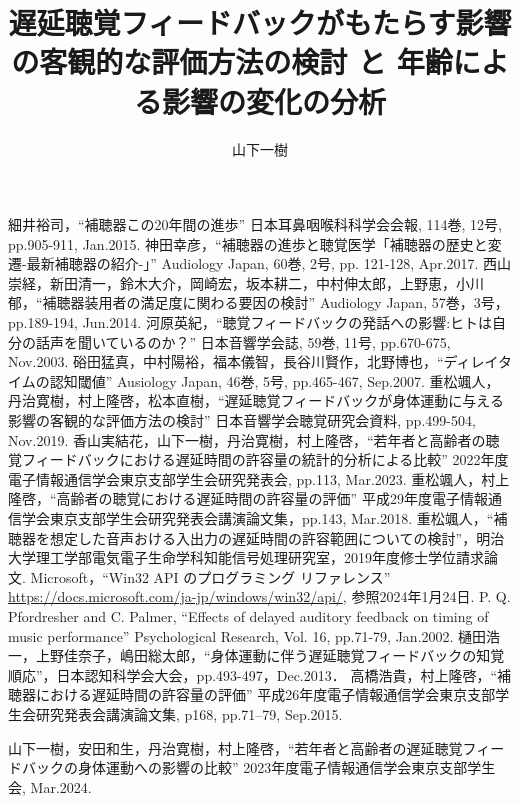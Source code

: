 \documentclass[a4paper,12pt]{jsreport}
\title{遅延聴覚フィードバックがもたらす影響の客観的な評価方法の検討
と
年齢による影響の変化の分析}
\author{山下\hspace{1zw}一樹}%
\begin{document}
\makecover%
\tableofcontents%










\begin{thebibliography}{99}
	細井裕司，``補聴器この20年間の進歩'' 日本耳鼻咽喉科科学会会報, 114巻, 12号, pp.905-911, Jan.2015.
  神田幸彦，``補聴器の進歩と聴覚医学「補聴器の歴史と変遷-最新補聴器の紹介-」'' Audiology Japan, 60巻, 2号, pp. 121-128, Apr.2017.
  西山崇経，新田清一，鈴木大介，岡崎宏，坂本耕二，中村伸太郎，上野恵，小川郁，``補聴器装用者の満足度に関わる要因の検討'' Audiology Japan, 57巻，3号，pp.189-194, Jun.2014.
  河原英紀，``聴覚フィードバックの発話への影響:ヒトは自分の話声を聞いているのか？'' 日本音響学会誌, 59巻, 11号, pp.670-675, Nov.2003.
  硲田猛真，中村陽裕，福本儀智，長谷川賢作，北野博也，``ディレイタイムの認知閾値'' Ausiology Japan, 46巻, 5号, pp.465-467, Sep.2007.
  重松颯人，丹治寛樹，村上隆啓，松本直樹，``遅延聴覚フィードバックが身体運動に与える影響の客観的な評価方法の検討'' 日本音響学会聴覚研究会資料, pp.499-504, Nov.2019.
  香山実結花，山下一樹，丹治寛樹，村上隆啓，``若年者と高齢者の聴覚フィードバックにおける遅延時間の許容量の統計的分析による比較'' 2022年度電子情報通信学会東京支部学生会研究発表会, pp.113, Mar.2023.
  重松颯人，村上隆啓，``高齢者の聴覚における遅延時間の許容量の評価'' 平成29年度電子情報通信学会東京支部学生会研究発表会講演論文集，pp.143, Mar.2018.
  重松颯人，``補聴器を想定した音声おける入出力の遅延時間の許容範囲についての検討''，明治大学理工学部電気電子生命学科知能信号処理研究室，2019年度修士学位請求論文.
  Microsoft，``Win32 API のプログラミング リファレンス'' \url{https://docs.microsoft.com/ja-jp/windows/win32/api/}, 参照2024年1月24日.
  P. Q. Pfordresher and C. Palmer, ``Effects of delayed auditory feedback on timing of music performance'' Psychological Research, Vol. 16, pp.71-79, Jan.2002.
  樋田浩一，上野佳奈子，嶋田総太郎，``身体運動に伴う遅延聴覚フィードバックの知覚順応''，日本認知科学会大会，pp.493-497，Dec.2013．
  高橋浩貴，村上隆啓，``補聴器における遅延時間の許容量の評価'' 平成26年度電子情報通信学会東京支部学生会研究発表会講演論文集, p168, pp.71--79, Sep.2015.

\end{thebibliography}
\begin{thepublished}{99}
	山下一樹，安田和生，丹治寛樹，村上隆啓，``若年者と高齢者の遅延聴覚フィードバックの身体運動への影響の比較'' 2023年度電子情報通信学会東京支部学生会, Mar.2024.
	
\end{thepublished}
\newpage



\appendix




\end{document}
